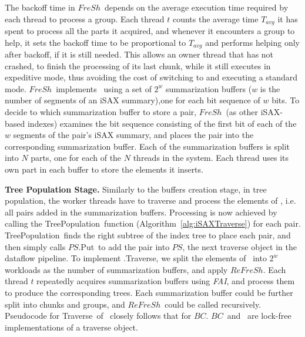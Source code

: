 \documentclass[a4paper,11pt,twoside,openany]{book}
\newcommand{\FAI}{\mbox{\textit{FAI}}}
\newcommand{\MBInsert}{\mbox{\sc MBInsert}}
\newcommand{\Put}{\mbox{\sc Put}}
\newcommand{\Traverse}{\mbox{\sc Traverse}}
\newcommand{\TreePopulation}{\mbox{\sc TreePopulation}}
\newcommand{\BC}{\mbox{$\mathit{BC}$}}
\newcommand{\PS}{\mbox{$\mathit{PS}$}}
\newcommand{\Refresh}{\mbox{$\mathit{ReFreSh}$}}
\newcommand{\Fresh}{\mbox{$\mathit{FreSh}$}}
\begin{document}
\begin{algorithm}[t]
\begin{algorithmic}[1]
    \end{algorithmic}

    \caption{Pseudocode for \textsc{Traverse} in \textsc{FreSh}. Code for thread $t$.}
    \label{alg:bc}
\end{algorithm}

The backoff time in \Fresh\ depends on the average execution time required by each
thread to process a group. Each thread $\mathit{t}$ counts the average time 
$T_{avg}$ it has spent to process all the parts it acquired, and whenever
it encounters a group to help, it sets the backoff time to be proportional
to $T_{avg}$ and performs helping only after backoff, if it is still needed.
This allows an owner thread that has not crashed, to finish the processing of its last chunk,
while it still executes in expeditive mode, thus avoiding the cost of switching
to and executing a standard mode.
% 
\Fresh\ implements \TP\ using a set of $2^w$ summarization buffers
($w$ is the number of segments of an iSAX summary),one for each bit sequence of $w$ bits.
To decide to which summarization buffer to store a pair,
\Fresh\ (as other iSAX-based indexes) 
examines the bit sequence consisting of the first bit of each 
of the $w$ segments of the pair's iSAX summary, 
and places the pair into the corresponding summarization buffer. 
Each of the summarization buffers is split into $N$ parts, one for each of the $N$ threads in the system.
Each thread uses its own part in each buffer to store the elements it inserts.


\noindent
{\bf Tree Population Stage.}
Similarly to the buffers creation stage, in tree population, the worker threads
have to traverse and process the elements of \TP, i.e. all pairs added in the summarization buffers.
Processing is now achieved by calling the \TreePopulation\ function (Algorithm~\ref{alg:iSAXTraverse})
for each pair. \TreePopulation\ finds the right subtree of the index tree to place each pair, and then 
simply calls \PS.\Put\ to add the pair into \PS, the next traverse object in the dataflow pipeline. 
To implement \TP.\Traverse, we split the elements of \TP\ into $2^w$ workloads 
as the number of summarization buffers, and apply \Refresh.
Each thread $\mathit{t}$ repeatedly acquires summarization buffers using \FAI,
and process them to produce the corresponding trees. 
% 
Each summarization buffer could be further split into chunks and groups, and \Refresh\ could be called recursively.
Pseudocode for \Traverse\ of \TP\ closely follows that for \BC.
\BC\ and \TP\ are lock-free implementations of a traverse object. 
\end{document}
